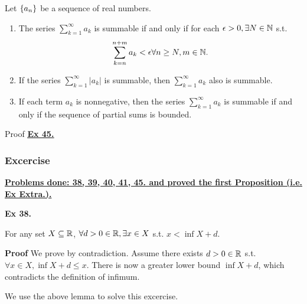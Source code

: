 \begin{prop}
    Let $\left\{a_n\right\}$ be a sequence of real numbers.
    \begin{enumerate}[label=(\roman*)]
        \item The series $\sum_{k=1}^\infty a_k$ is summable if and only if for each $\epsilon > 0, \exists N\in\mathbb{N}$ s.t.
        \[ \sum_{k=n}^{n+m} a_k < \epsilon \forall n \ge N, m \in \mathbb{N}.\]
        \item If the series $\sum_{k=1}^\infty |a_k|$ is summable, then $\sum_{k=1}^\infty a_k$ also is summable.
        \item If each term $a_k$ is nonnegative, then the series $\sum_{k=1}^\infty a_k$ is summable if and only if the sequence of partial sums is bounded.
    \end{enumerate}
    Proof \hyperref[ex:45]{\underline{\textbf{Ex 45.}}}
\end{prop}

\subsubsection{Excercise}
\underline{\textbf{Problems done: 38, 39, 40, 41, 45. and proved the first Proposition (i.e. Ex Extra.).}}
\bigskip

\noindent {} \textbf{Ex 38.}
\begin{lem}
    For any set $X\subseteq \mathbb{R}$, $\forall d > 0 \in \mathbb{R}, \exists x \in X$ s.t. $x < \inf X + d$.
\end{lem}

\textbf{Proof} We prove by contradiction. Assume there exists $d > 0 \in \mathbb{R}$ s.t. 
$\forall x \in X, \inf X + d \leq x$. There is now a greater lower bound $\inf X + d$, which contradicts the definition of infimum.

\bigskip

\noindent We use the above lemma to solve this excercise.

